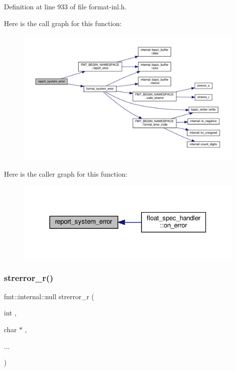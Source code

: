 Definition at line 933 of file format-\/inl.\+h.

Here is the call graph for this function\+:
\nopagebreak
\begin{figure}[H]
\begin{center}
\leavevmode
\includegraphics[width=350pt]{format-inl_8h_a82b610312f3005c8480b1d8439b129be_cgraph}
\end{center}
\end{figure}
Here is the caller graph for this function\+:
\nopagebreak
\begin{figure}[H]
\begin{center}
\leavevmode
\includegraphics[width=318pt]{format-inl_8h_a82b610312f3005c8480b1d8439b129be_icgraph}
\end{center}
\end{figure}
\mbox{\label{format-inl_8h_a8307cb500850a7c5033cf64702e15990}} 
\subsubsection{\texorpdfstring{strerror\+\_\+r()}{strerror\_r()}}
{\footnotesize\ttfamily fmt\+::internal\+::null strerror\+\_\+r (\begin{DoxyParamCaption}\item[{int}]{,  }\item[{char $\ast$}]{,  }\item[{}]{... }\end{DoxyParamCaption})\hspace{0.3cm}{\ttfamily [inline]}}



